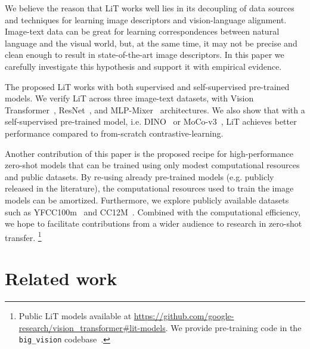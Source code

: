 \documentclass[10pt,twocolumn,letterpaper]{article}
\makeatletter
\def \lit {LiT\xspace}
\renewcommand*{\eg}{e.g.\@\xspace}
\renewcommand*{\ie}{i.e.\@\xspace}
\makeatother
\begin{document}
We believe the reason that \lit{} works well lies in its decoupling of data sources and techniques for learning image descriptors and vision-language alignment. Image-text data can be great for learning correspondences between natural language and the visual world, but, at the same time, it may not be precise and clean enough to result in state-of-the-art image descriptors. In this paper we carefully investigate this hypothesis and support it with empirical evidence.

The proposed \lit{} works with both supervised and self-supervised pre-trained models.
We verify \lit{} across three image-text datasets, with Vision Transformer~\cite{vit}, ResNet~\cite{bit}, and MLP-Mixer~\cite{mixer} architectures. 
We also show that with a self-supervised pre-trained model, \ie DINO~\cite{dino} or MoCo-v3~\cite{mocov3}, \lit{} achieves better performance compared to from-scratch contrastive-learning. 

Another contribution of this paper is the proposed recipe for high-performance zero-shot models that can be trained using only modest computational resources and public datasets.
By re-using already pre-trained models (\eg publicly released in the literature), the computational resources used to train the image models can be amortized.
Furthermore, we explore publicly available datasets such as YFCC100m~\cite{yfcc100m} and CC12M~\cite{cc12m}.
Combined with the computational efficiency, we hope to facilitate contributions from a wider audience to research in zero-shot transfer. \footnote{Public LiT models available at \url{https://github.com/google-research/vision_transformer\#lit-models}. We provide pre-training code in the {\tt big\_vision} codebase~\cite{big_vision}.}


\section{Related work}\label{sec:rw}
\end{document}
